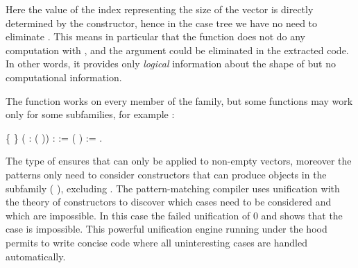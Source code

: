 Here the value of the index representing the size of the vector 
   is directly determined by the constructor, hence in the case tree
   we have no need to eliminate . This means in particular that 
   the function  does not do any computation with , and 
   the argument could be eliminated in the extracted code.
   In other words, it provides only \textit{logical} information about 
   the shape of  but no computational information.


   The  function works on every member of the  family,
   but some functions may work only for some subfamilies, for example
   :
 \begin{coqdoccode}
\coqdocemptyline
\coqdocnoindent
{}  \{ \} ( :   ( )) :    :=\coqdoceol
\coqdocnoindent
{} (  ) := .\coqdoceol
\coqdocemptyline
\end{coqdoccode}
The type of  ensures that  can only be applied to 
   non-empty vectors, moreover the patterns only need to consider 
   constructors that can produce objects in the subfamily   ( ),
   excluding . The pattern-matching compiler uses unification 
   with the theory of constructors to discover which cases need to 
   be considered and which are impossible. In this case the failed 
   unification of 0 and   shows that the  case is impossible.
   This powerful unification engine running under the hood permits to write
   concise code where all uninteresting cases are handled automatically. 

